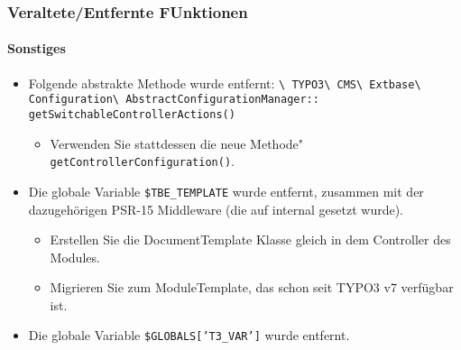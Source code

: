 \begin{frame}[fragile]
	\frametitle{Veraltete/Entfernte FUnktionen}
	\framesubtitle{Sonstiges}

	\begin{itemize}

		\item Folgende abstrakte Methode wurde entfernt:\newline
			\smaller
				\texttt{\textbackslash
					TYPO3\textbackslash
					CMS\textbackslash
					Extbase\textbackslash
					Configuration\textbackslash
					AbstractConfigurationManager::}\newline
					\texttt{getSwitchableControllerActions()}
			\normalsize

			\begin{itemize}\smaller
				\item[\ding{228}] Verwenden Sie stattdessen die neue Methode" \texttt{getControllerConfiguration()}.
			\end{itemize}\normalsize

		\item Die globale Variable \texttt{\$TBE\_TEMPLATE} wurde entfernt, zusammen mit der 
			dazugehörigen PSR-15 Middleware (die auf internal gesetzt wurde).

			\begin{itemize}\smaller
				\item[\ding{228}] Erstellen Sie die DocumentTemplate Klasse gleich in dem Controller des Modules.
				\item[\ding{228}] Migrieren Sie zum ModuleTemplate, das schon seit TYPO3 v7 verfügbar ist.
			\end{itemize}\normalsize

		\item Die globale Variable \texttt{\$GLOBALS['T3\_VAR']} wurde entfernt.\newline

	\end{itemize}

\end{frame}

